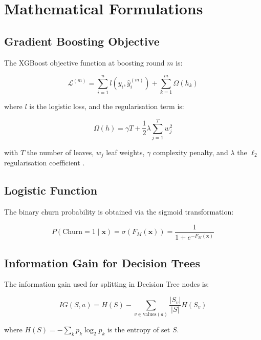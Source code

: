 \section{Mathematical Formulations}

\subsection{Gradient Boosting Objective}

The XGBoost objective function at boosting round $m$ is:

\begin{equation}
\mathcal{L}^{(m)} = \sum_{i=1}^{n} l(y_i, \hat{y}_i^{(m)}) + \sum_{k=1}^{m} \Omega(h_k)
\end{equation}

where $l$ is the logistic loss, and the regularisation term is:

\begin{equation}
\Omega(h) = \gamma T + \frac{1}{2}\lambda \sum_{j=1}^{T} w_j^2
\end{equation}

with $T$ the number of leaves, $w_j$ leaf weights, $\gamma$ complexity penalty, and $\lambda$ the $\ell_2$ regularisation coefficient \cite{chen2016xgboost}.

\subsection{Logistic Function}

The binary churn probability is obtained via the sigmoid transformation:

\begin{equation}
P(\text{Churn}=1 \mid \mathbf{x}) = \sigma(F_M(\mathbf{x})) = \frac{1}{1 + e^{-F_M(\mathbf{x})}}
\end{equation}

\subsection{Information Gain for Decision Trees}

The information gain used for splitting in Decision Tree nodes is:

\begin{equation}
IG(S, a) = H(S) - \sum_{v \in \text{values}(a)} \frac{|S_v|}{|S|} H(S_v)
\end{equation}

where $H(S) = -\sum_{k} p_k \log_2 p_k$ is the entropy of set $S$.

